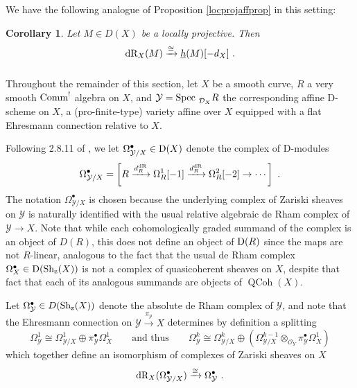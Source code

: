 \documentclass[11pt]{amsart}
\numberwithin{equation}{section}
\newtheorem{coro}[theo]{Corollary}
\theoremstyle{definition}
\newcommand{\mc}{\mathcal}
\newcommand{\Spec}{{\textup{Spec\ }}}
\newcommand{\dR}{{\textup{dR}}}
\newcommand{\Sh}{{\textup{Sh}}}
\newcommand{\Comm}{{\textup{Comm}}}
\newcommand{\z}{{\textup{z}}}
\newcommand{\0}{{\textbf{0}}}
\DeclareMathOperator{\QC}{QCoh}
\newcommand{\Dd}{{\textup{D}}}
\newcommand{\DD}{{D}}
\begin{document}
We have the following analogue of Proposition \ref{locprojaffprop} in this setting:
\begin{coro} Let $M\in \DD(X)$ be a locally projective. Then
\[ \dR_X(M) \xrightarrow{\cong} \underline{h}(M)[-d_X] \ .\]
\end{coro}



\subsubsection{}Throughout the remainder of this section, let $X$ be a smooth curve, $R$ a very smooth $\Comm^!$ algebra on $X$, and $\mc Y=\Spec_{\mc D_X}R$ the corresponding affine D-scheme on $X$, a (pro-finite-type) variety affine over $X$ equipped with a flat Ehresmann connection relative to $X$.


Following 2.8.11 of \cite{BD1}, we let $\Omega^\bullet_{\mc Y/X}\in \Dd(X)$ denote the complex of D-modules
\[\Omega^\bullet_{\mc Y/X} = \left[ R \xrightarrow{d^\dR_R} \Omega^1_R[-1] \xrightarrow{d^\dR_R}\Omega^2_R[-2] \to\cdots \right]  \ . \]
The notation $\Omega_{\mc Y/X}^\bullet$ is chosen because the underlying complex of Zariski sheaves on $\mc Y$ is naturally identified with the usual relative algebraic de Rham complex of $\mc Y\to X$. Note that while each cohomologically graded summand of the complex is an object of $\DD(R)$, this does not define an object of $\Dd(R)$ since the maps are not $R$-linear, analogous to the fact that the usual de Rham complex $\Omega^\bullet_X\in \Dd(\Sh_\z(X))$ is not a complex of quasicoherent sheaves on $X$, despite that fact that each of its analogous summands are objects of $\QC(X)$.


Let $\Omega^\bullet_{\mc Y}\in \DD(\Sh_\z(X))$ denote the absolute de Rham complex of $\mc Y$, and note that the Ehresmann connection on $\mc Y \xrightarrow{\pi_{\mc Y}} X$ determines by definition a splitting
\[ \Omega^1_{\mc Y} \cong \Omega^1_{\mc Y/X} \oplus \pi_{\mc Y}^\bullet \Omega^1_X \qquad \text{and thus} \qquad \Omega^k_{\mc Y} \cong \Omega^k_{\mc Y/X} \oplus( \Omega^{k-1}_{\mc Y/X}\otimes_{\mc O_Y} \pi_{\mc Y}^\bullet \Omega^1_X  )\]
which together define an isomorphism of complexes of Zariski sheaves on $X$
\[  \dR_X( \Omega^\bullet_{\mc Y/X}) \xrightarrow{\cong} \Omega^\bullet_{\mc Y} \ .\]
\end{document}
